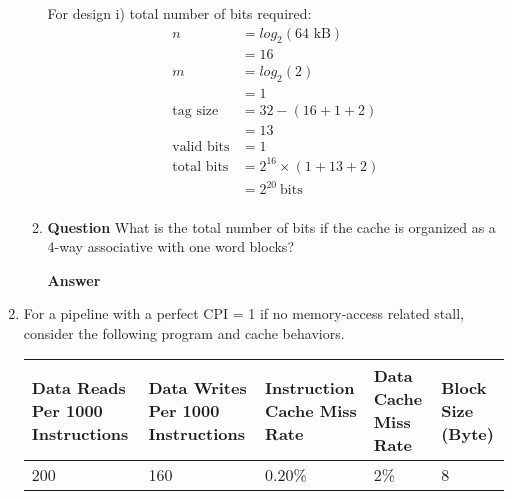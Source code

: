 \documentclass[10pt]{extarticle}
\begin{document}
\begin{enumerate}
\begin{enumerate}
            For design i) total number of bits required:
            \begin{equation*}
                \begin{split}
                    n & = log_2(\text{64 kB}) \\
                    & = 16 \\
                    m & = log_2(\text{2}) \\
                    & = 1 \\
                    \text{tag size} & = 32 - (16 + 1 + 2) \\
                    & = 13 \\
                    \text{valid bits} & = 1 \\
                    \text{total bits} & = 2^{16} \times (1 + 13 + 2) \\
                    & = 2^{20} \ \text{bits} \\
                \end{split}
            \end{equation*}

            \item \textbf{Question} What is the total number of bits if the
            cache is organized as a 4-way associative with one word blocks?

            \textbf{Answer}

        \end{enumerate}

            \item For a pipeline with a perfect CPI = 1 if no memory-access
            related stall, consider the following program and cache behaviors.

            \begin{table}[h]
                \centering
                \begin{tabular}{p{2cm}p{2cm}p{2cm}p{2cm}p{1.5cm}}
                    \textbf{Data Reads Per 1000 Instructions} & \textbf{Data
                    Writes Per 1000 Instructions} & \textbf{Instruction Cache
                    Miss Rate} & \textbf{Data Cache Miss Rate} & \textbf{Block
                    Size (Byte)} \\
                    \hline
                    200 & 160 & 0.20\% & 2\% & 8 \\
                \end{tabular}
            \end{table}

        \begin{enumerate}


\end{enumerate}
\end{enumerate}
\end{document}
